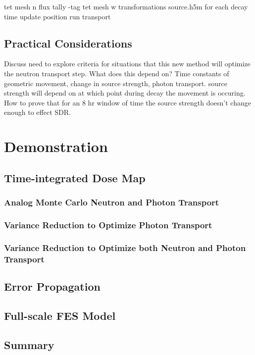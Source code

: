 tet mesh n flux tally
-tag tet mesh w transformations
source.h5m for each decay time
update position
run transport

\subsection{Practical Considerations}
Discuss need to explore criteria for situations that this new method will
optimize the neutron transport step.  What does this depend on?  Time constants
of geometric movement, change in source strength, photon transport.  source
strength will depend on at which point during decay the movement is occuring.
How to prove that for an 8 hr window of time the source strength doesn't change
enough to effect SDR.
\section{Demonstration} \label{sec:demo}


\subsection{Time-integrated Dose Map}

\subsubsection{Analog Monte Carlo Neutron and Photon Transport}\label{sec:analog_n_p}

\subsubsection{Variance Reduction to Optimize Photon Transport}\label{sec:vr_p}

\subsubsection{Variance Reduction to Optimize both Neutron and Photon Transport}\label{sec:vr_n_p}

\subsection{Error Propagation}\label{sec:error}

\subsection{Full-scale FES Model} \label{sec:full_scale}

\subsection{Summary}\label{sec:summary}

